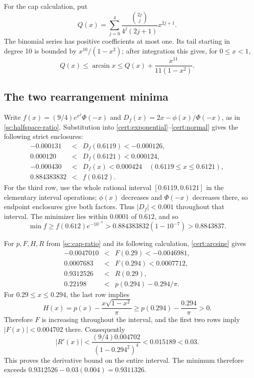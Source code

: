 For the cap calculation, put
\[
 Q(x)=\sum_{j=0}^4\frac{\binom{2j}{j}}{4^j(2j+1)}x^{2j+1}.
\]
The binomial series has positive coefficients at most one. Its tail
starting in degree 10 is bounded by \(x^{10}/(1-x^2)\); after
integration this gives, for \(0\le x<1\),
\begin{equation}\label{cert:arcsine}
 Q(x)\le\arcsin x\le Q(x)+\frac{x^{11}}{11(1-x^2)}.
\end{equation}

\subsection{The two rearrangement minima}
Write \(f(x)=(9/4)e^{x^2}\Phi(-x)\) and
\(D_f(x)=2x-\phi(x)/\Phi(-x)\), as in
\eqref{sc:halfspace-ratio}. Substitution into
\eqref{cert:exponential}--\eqref{cert:normal} gives the following
strict enclosures:
\[
\begin{array}{rcl}
 -0.000131&<&D_f(0.6119)<-0.000126,\\
  0.000120&<&D_f(0.6121)< 0.000124,\\
 -0.000430&<&D_f(x)<0.000424
               \quad(0.6119\le x\le0.6121),\\
  0.884383832&<&f(0.612).
\end{array}
\]
For the third row, use the whole rational interval
\([0.6119,0.6121]\) in the elementary interval operations;
\(\phi(x)\) decreases and \(\Phi(-x)\) decreases there, so endpoint
enclosures give both factors. Thus \(|D_f|<0.001\) throughout that
interval. The minimizer lies within \(0.0001\) of \(0.612\), and so
\[
 \min f\ge f(0.612)e^{-10^{-7}}
 >0.884383832(1-10^{-7})>0.8843837.
\]

For \(p,F,H,R\) from \eqref{sc:cap-ratio} and its following
calculation, \eqref{cert:arcsine} gives
\[
\begin{array}{rcl}
 -0.0047010&<&F(0.29)<-0.0046981,\\
  0.0007683&<&F(0.294)<0.0007712,\\
  0.9312526&<&R(0.29),\\
  0.22198&<&p(0.294)-0.294/\pi.
\end{array}
\]
For \(0.29\le x\le0.294\), the last row implies
\[
 H(x)=p(x)-\frac{x\sqrt{1-x^2}}\pi
 \ge p(0.294)-\frac{0.294}\pi>0.
\]
Therefore \(F\) is increasing throughout the interval, and the first
two rows imply \(|F(x)|<0.004702\) there. Consequently
\[
 |R'(x)|<\frac{(9/4)0.004702}{(1-0.294^2)^4}
 <0.015189<0.03.
\]
This proves the derivative bound on the entire interval. The minimum
therefore exceeds \(0.9312526-0.03(0.004)=0.9311326\).

